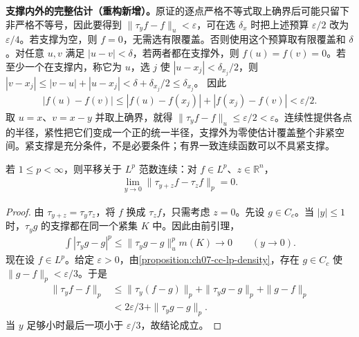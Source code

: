 \documentclass[../../main.tex]{subfiles}
\begin{document}
\begin{remark}
\textbf{支撑内外的完整估计（重构新增）。}原证的逐点严格不等式取上确界后可能只留下非严格不等号，因此要得到 $\|\tau_yf-f\|_u<\varepsilon$，可在选 $\delta_x$ 时把上述预算 $\varepsilon/2$ 改为 $\varepsilon/4$。若支撑为空，则 $f=0$，无需选有限覆盖。否则使用这个预算取有限覆盖和 $\delta$。对任意 $u,v$ 满足 $|u-v|<\delta$，若两者都在支撑外，则 $f(u)=f(v)=0$。若至少一个在支撑内，称它为 $u$，选 $j$ 使 $|u-x_j|<\delta_{x_j}/2$，则
$|v-x_j|\leqslant|v-u|+|u-x_j|<\delta+\delta_{x_j}/2\leqslant\delta_{x_j}$。
因此
\begin{align*}
|f(u)-f(v)|\leqslant|f(u)-f(x_j)|+|f(x_j)-f(v)|<\varepsilon/2.
\end{align*}
取 $u=x$、$v=x-y$ 并取上确界，就得 $\|\tau_yf-f\|_u\leqslant\varepsilon/2<\varepsilon$。连续性提供各点的半径，紧性把它们变成一个正的统一半径，支撑外为零使估计覆盖整个非紧空间。紧支撑是充分条件，不是必要条件；有界一致连续函数可以不具紧支撑。
\end{remark}
\begin{proposition}\label{proposition:ch08-lp-translation-continuity}
若 $1\leqslant p<\infty$，则平移关于 $L^p$ 范数连续：对 $f\in L^p$、$z\in\mathbb R^n$，
\begin{align*}
\lim_{y\to0}\|\tau_{y+z}f-\tau_zf\|_p=0.
\end{align*}
\end{proposition}
\begin{proof}
由 $\tau_{y+z}=\tau_y\tau_z$，将 $f$ 换成 $\tau_zf$，只需考虑 $z=0$。先设 $g\in C_c$。当 $|y|\leqslant1$ 时，$\tau_yg$ 的支撑都在同一个紧集 $K$ 中。因此由前引理，
\begin{align*}
\int|\tau_yg-g|^p\leqslant\|\tau_yg-g\|_u^p m(K)\longrightarrow0
\qquad(y\to0).
\end{align*}
现在设 $f\in L^p$。给定 $\varepsilon>0$，由\cref{proposition:ch07-cc-lp-density}，存在 $g\in C_c$ 使 $\|g-f\|_p<\varepsilon/3$。于是
\begin{align*}
\|\tau_yf-f\|_p
&\leqslant\|\tau_y(f-g)\|_p+\|\tau_yg-g\|_p+\|g-f\|_p\\
&<2\varepsilon/3+\|\tau_yg-g\|_p.
\end{align*}
当 $y$ 足够小时最后一项小于 $\varepsilon/3$，故结论成立。
\end{proof}
\end{document}
